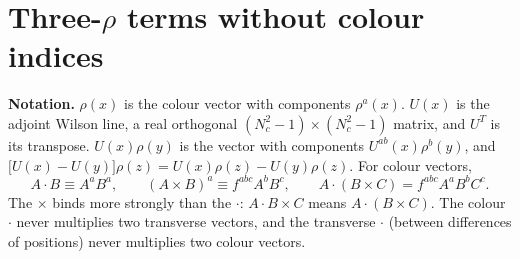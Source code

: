 \documentclass[10pt]{article}
\begin{document}
\section*{Three-$\rho$ terms without colour indices}
\noindent\textbf{Notation.} $\rho(x)$ is the colour vector with components $\rho^{a}(x)$. $U(x)$ is the adjoint Wilson line, a real orthogonal $(N_{c}^{2}-1)\times(N_{c}^{2}-1)$ matrix, and $U^{T}$ is its transpose. $U(x)\rho(y)$ is the vector with components $U^{ab}(x)\rho^{b}(y)$, and $\big[U(x)-U(y)\big]\rho(z)=U(x)\rho(z)-U(y)\rho(z)$. For colour vectors,
\begin{equation*}
A\cdot B\equiv A^{a}B^{a},\qquad (A\times B)^{a}\equiv f^{abc}A^{b}B^{c},\qquad A\cdot(B\times C)=f^{abc}A^{a}B^{b}C^{c}.
\end{equation*}
The $\times$ binds more strongly than the $\cdot$: $A\cdot B\times C$ means $A\cdot(B\times C)$. The colour $\cdot$ never multiplies two transverse vectors, and the transverse $\cdot$ (between differences of positions) never multiplies two colour vectors.
\end{document}
